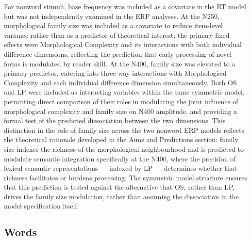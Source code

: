 \documentclass[utf8]{FrontiersinHarvard} %
\begin{document}
	For nonword stimuli, base frequency was included as a covariate in the RT model but was not independently examined in the ERP analyses. At the N250, morphological family size was included as a covariate to reduce item-level variance rather than as a predictor of theoretical interest; the primary fixed effects were Morphological Complexity and its interactions with both individual difference dimensions, reflecting the prediction that early processing of novel forms is modulated by reader skill. At the N400, family size was elevated to a primary predictor, entering into three-way interactions with Morphological Complexity and each individual difference dimension simultaneously. Both OS and LP were included as interacting variables within the same symmetric model, permitting direct comparison of their roles in modulating the joint influence of morphological complexity and family size on N400 amplitude, and providing a formal test of the predicted dissociation between the two dimensions. This distinction in the role of family size across the two nonword ERP models reflects the theoretical rationale developed in the Aims and Predictions section: family size indexes the richness of the morphological neighbourhood and is predicted to modulate semantic integration specifically at the N400, where the precision of lexical-semantic representations --- indexed by LP --- determines whether that richness facilitates or burdens processing. The symmetric model structure ensures that this prediction is tested against the alternative that OS, rather than LP, drives the family size modulation, rather than assuming the dissociation in the model specification itself.
	
	\subsection{Words}
	
\end{document}
